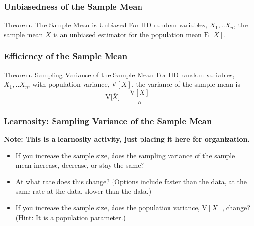 \documentclass[12pt, block=fill]{beamer}
\newcommand{\E}{\text{E}}
\newcommand{\V}{\text{V}}
\begin{document}
\begin{frame}[t]
  \frametitle{Unbiasedness of the Sample Mean}
  \begin{block}{Theorem: The Sample Mean is Unbiased}
    For IID random variables, $X_1,..X_n$, the sample mean $\overline{X}$ is an unbiased estimator for the population mean $\E[X]$.
    \end{block}
\end{frame}


\begin{frame}[t]
  \frametitle{Efficiency of the Sample Mean}
  \begin{block}{Theorem: Sampling Variance of the Sample Mean}
    For IID random variables, $X_1,..X_n$, with population variance, $\V[X]$, the variance of the sample mean is
     \[
        \V\big[\overline{X}\big] = \frac{\V[X]}{n}
      \]
    \end{block}
    \note[item]{  $      \V\big[\overline{X}\big]  = \V[ \frac{1}{n} (X_1 + X_2 +...+X_n)] $}
    \note[item]{$= \frac{1}{n^2} ( \V[X_1] + ... + \V[X_n] ) = \frac{\V[X] }{n} $}
\end{frame}

\begin{frame}
  \frametitle{Learnosity: Sampling Variance of the Sample Mean}
  \textbf{Note: This is a learnosity activity, just placing it here
    for organization.}

  \begin{itemize}
  \item If you increase the sample size, does the sampling variance of
    the sample mean increase, decrease, or stay the same?
  \item At what rate does this change? (Options include faster than
    the data, at the same rate at the data, slower than the data.)
  \item If you increase the sample size, does the population variance,
    $\V[X]$, change? (Hint: It is a population parameter.)
  \end{itemize}
\end{frame}
\end{document}
